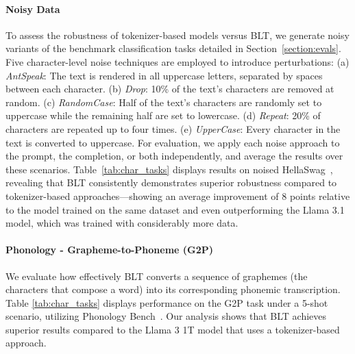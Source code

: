 \paragraph{Noisy Data} To assess the robustness of tokenizer-based models versus {\textsc BLT}, we generate noisy variants of the benchmark classification tasks detailed in Section~\ref{section:evals}. Five character-level noise techniques are employed to introduce perturbations: (a) \textit{AntSpeak}: The text is rendered in all uppercase letters, separated by spaces between each character. (b) \textit{Drop}: 10\% of the text's characters are removed at random. (c) \textit{RandomCase}: Half of the text’s characters are randomly set to uppercase while the remaining half are set to lowercase. (d) \textit{Repeat}: 20\% of characters are repeated up to four times. (e) \textit{UpperCase}: Every character in the text is converted to uppercase. For evaluation, we apply each noise approach to the prompt, the completion, or both independently, and average the results over these scenarios. Table~\ref{tab:char_tasks} displays results on noised HellaSwag~\citep{Eval_hellaswag}, revealing that {\textsc BLT} consistently demonstrates superior robustness compared to tokenizer-based approaches—showing an average improvement of 8 points relative to the model trained on the same dataset and even outperforming the Llama 3.1 model, which was trained with considerably more data.

\paragraph{Phonology - Grapheme-to-Phoneme (G2P)} We evaluate how effectively {\textsc BLT} converts a sequence of graphemes (the characters that compose a word) into its corresponding phonemic transcription. Table \ref{tab:char_tasks} displays performance on the G2P task under a 5-shot scenario, utilizing Phonology Bench~\citep{suvarna2024phonologybench}. Our analysis shows that {\textsc BLT} achieves superior results compared to the Llama 3 1T model that uses a tokenizer-based approach.

